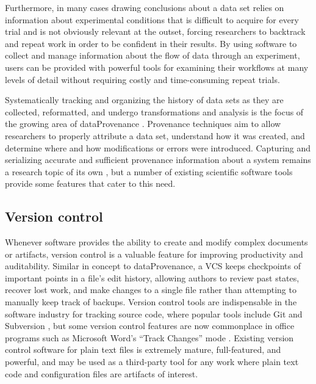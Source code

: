 \documentclass[../thesis]{subfiles}
\begin{document}
Furthermore, in many cases drawing conclusions about a data set relies on
information about experimental conditions that is
difficult to acquire for every trial and is not obviously
relevant at the outset, forcing researchers to backtrack and repeat
work in order to be confident in their results. By using software to
collect and manage information about the flow of data through an
experiment, users can be provided with powerful tools for examining
their workflows at many levels of detail without requiring costly and
time-consuming repeat trials.

Systematically tracking and organizing the history of data sets as
they are collected, reformatted, and undergo transformations and
analysis is the focus of the growing area of \gls{dataProvenance} \cite{buneman2000data}.
Provenance techniques aim to allow researchers to properly attribute a
data set, understand how it was created, and determine where and how
modifications or errors were introduced. Capturing and serializing
accurate and sufficient provenance information about a system remains
a research topic of its own \cite{Cheney:2009:PFH:1639950.1640064},
but a number of existing scientific software tools provide some
features that cater to this need.

\subsection{Version control}
Whenever software provides the ability to create and modify complex
documents or \glspl{artifact}, version control
is a valuable feature for improving productivity and
auditability. Similar in concept to \gls{dataProvenance}, a \gls{VCS}
keeps checkpoints of important points in a file's edit history,
allowing authors to review past states, recover lost work, and make
changes to a single file rather than attempting to manually keep track
of backups. Version control tools are indispensable in the software
industry for tracking source code, where popular tools include Git
\cite{Git} and Subversion \cite{Subversion}, but some version control features are
now commonplace in office programs such as Microsoft Word's ``Track
Changes'' mode \cite{Word}. Existing version control software for plain
text files is extremely mature, full-featured, and powerful, and may
be used as a third-party tool for any work where plain text code and
configuration files are \glspl{artifact} of interest.
\end{document}
